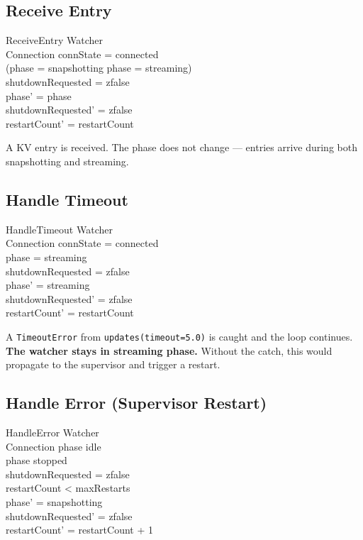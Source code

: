 \documentclass[a4paper,10pt,fleqn]{article}
\begin{document}
\subsection{Receive Entry}

\begin{schema}{ReceiveEntry}
  \Delta Watcher \\
  \Xi Connection
  \where
  connState = connected \\
  (phase = snapshotting \lor phase = streaming) \\
  shutdownRequested = zfalse \\
  phase' = phase \\
  shutdownRequested' = zfalse \\
  restartCount' = restartCount
\end{schema}

A KV entry is received.  The phase does not change --- entries
arrive during both snapshotting and streaming.

\subsection{Handle Timeout}

\begin{schema}{HandleTimeout}
  \Delta Watcher \\
  \Xi Connection
  \where
  connState = connected \\
  phase = streaming \\
  shutdownRequested = zfalse \\
  phase' = streaming \\
  shutdownRequested' = zfalse \\
  restartCount' = restartCount
\end{schema}

A \texttt{TimeoutError} from \texttt{updates(timeout=5.0)} is
caught and the loop continues.  \textbf{The watcher stays in
streaming phase.}  Without the catch, this would propagate to
the supervisor and trigger a restart.

\subsection{Handle Error (Supervisor Restart)}

\begin{schema}{HandleError}
  \Delta Watcher \\
  \Xi Connection
  \where
  phase \neq idle \\
  phase \neq stopped \\
  shutdownRequested = zfalse \\
  restartCount < maxRestarts \\
  phase' = snapshotting \\
  shutdownRequested' = zfalse \\
  restartCount' = restartCount + 1
\end{schema}
\end{document}
